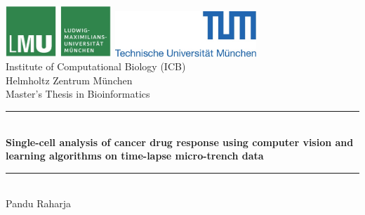 \documentclass[pdftex,12pt,a4paper]{report}
\newcommand{\HRule}{\rule{\linewidth}{0.5mm}}
\begin{document}
\begin{titlepage}

\sffamily

\begin{center}


\includegraphics[width=0.3\textwidth]{logo2.jpg}
\hfill
\includegraphics[width=0.4\textwidth]{logo1.jpg}  
\\[5cm]

{\Huge Institute of Computational Biology (ICB)}\\[0.5cm]
{\Huge Helmholtz Zentrum M\"unchen}\\[1cm]

{\Huge Master's Thesis in Bioinformatics}\\[1.5cm]

\HRule \\[0.4cm]
{ \huge \bfseries Single-cell analysis of cancer drug response using computer vision and learning algorithms on time-lapse micro-trench data}\\[0.4cm]

\HRule \\[1.5cm]

{\Huge Pandu Raharja}\\[2.5cm]

\vfill
\end{center}
\end{titlepage}
\end{document}
